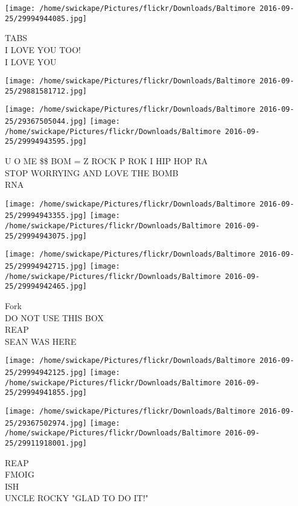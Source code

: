 \documentclass[10pt,letterpaper]{article}
\begin{document}
\vspace{0.25in}
\texttt{[image: /home/swickape/Pictures/flickr/Downloads/Baltimore 2016-09-25/29994944085.jpg]}

TABS\\
I LOVE YOU TOO!\\
I LOVE YOU\\
\pagebreak

\texttt{[image: /home/swickape/Pictures/flickr/Downloads/Baltimore 2016-09-25/29881581712.jpg]}

\vspace{0.25in}
\texttt{[image: /home/swickape/Pictures/flickr/Downloads/Baltimore 2016-09-25/29367505044.jpg]}
\texttt{[image: /home/swickape/Pictures/flickr/Downloads/Baltimore 2016-09-25/29994943595.jpg]}

U O ME \$\$ BOM = Z ROCK P ROK I HIP HOP RA\\
STOP WORRYING AND LOVE THE BOMB\\
RNA\\
\pagebreak

\texttt{[image: /home/swickape/Pictures/flickr/Downloads/Baltimore 2016-09-25/29994943355.jpg]}
\texttt{[image: /home/swickape/Pictures/flickr/Downloads/Baltimore 2016-09-25/29994943075.jpg]}

\texttt{[image: /home/swickape/Pictures/flickr/Downloads/Baltimore 2016-09-25/29994942715.jpg]}
\texttt{[image: /home/swickape/Pictures/flickr/Downloads/Baltimore 2016-09-25/29994942465.jpg]}

Fork\\
DO NOT USE THIS BOX\\
REAP\\
SEAN WAS HERE\\
\pagebreak

\texttt{[image: /home/swickape/Pictures/flickr/Downloads/Baltimore 2016-09-25/29994942125.jpg]}
\texttt{[image: /home/swickape/Pictures/flickr/Downloads/Baltimore 2016-09-25/29994941855.jpg]}

\texttt{[image: /home/swickape/Pictures/flickr/Downloads/Baltimore 2016-09-25/29367502974.jpg]}
\texttt{[image: /home/swickape/Pictures/flickr/Downloads/Baltimore 2016-09-25/29911918001.jpg]}

REAP\\
FMOIG\\
ISH\\
UNCLE ROCKY "GLAD TO DO IT!"\\
\pagebreak
\end{document}
